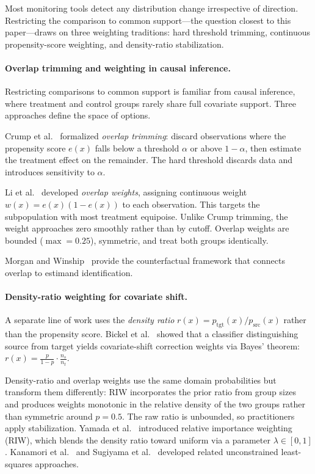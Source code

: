 Most monitoring tools detect any distribution change irrespective of direction. Restricting the comparison to common support---the question closest to this paper---draws on three weighting traditions: hard threshold trimming, continuous propensity-score weighting, and density-ratio stabilization.

\paragraph{Overlap trimming and weighting in causal inference.}
Restricting comparisons to common support is familiar from causal inference, where treatment and control groups rarely share full covariate support. Three approaches define the space of options.

Crump et al.~\cite{Crump_2009} formalized \emph{overlap trimming}: discard observations where the propensity score $e(x)$ falls below a threshold $\alpha$ or above $1-\alpha$, then estimate the treatment effect on the remainder. The hard threshold discards data and introduces sensitivity to $\alpha$.

Li et al.~\cite{Li_2018_balancing,Li_2019} developed \emph{overlap weights}, assigning continuous weight $w(x) = e(x)(1-e(x))$ to each observation. This targets the subpopulation with most treatment equipoise. Unlike Crump trimming, the weight approaches zero smoothly rather than by cutoff. Overlap weights are bounded ($\max = 0.25$), symmetric, and treat both groups identically.

Morgan and Winship~\cite{Morgan_2015} provide the counterfactual framework that connects overlap to estimand identification.

\paragraph{Density-ratio weighting for covariate shift.}
A separate line of work uses the \emph{density ratio} $r(x) = p_{\mathrm{tgt}}(x) / p_{\mathrm{src}}(x)$ rather than the propensity score. Bickel et al.~\cite{Bickel_2007} showed that a classifier distinguishing source from target yields covariate-shift correction weights via Bayes' theorem: $r(x) = \frac{p}{1-p} \cdot \frac{n_s}{n_t}$.

Density-ratio and overlap weights use the same domain probabilities but transform them differently: RIW incorporates the prior ratio from group sizes and produces weights monotonic in the relative density of the two groups rather than symmetric around $p=0.5$. The raw ratio is unbounded, so practitioners apply stabilization. Yamada et al.~\cite{Yamada_2013} introduced relative importance weighting (RIW), which blends the density ratio toward uniform via a parameter $\lambda \in [0,1]$. Kanamori et al.~\cite{Kanamori_2012} and Sugiyama et al.~\cite{Sugiyama_2012} developed related unconstrained least-squares approaches.

